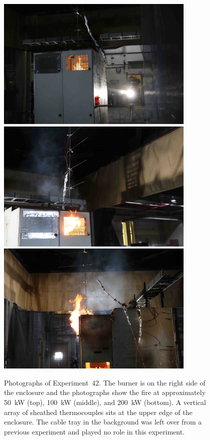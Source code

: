 \begin{figure}[p]
\centering
\includegraphics[height=2.50in]{../FIGURES/Test_42_start} \\ \vspace{0.1in}
\includegraphics[height=2.50in]{../FIGURES/Test_42_rear} \\ \vspace{0.1in}
\includegraphics[height=2.50in]{../FIGURES/Test_42_side}
\caption[Photographs of Experiment~42]{Photographs of Experiment~42. The burner is on the right side of the enclosure and the photographs show the fire at approximately 50~kW (top), 100~kW (middle), and 200~kW (bottom). A vertical array of sheathed thermocouples sits at the upper edge of the enclosure. The cable tray in the background was left over from a previous experiment and played no role in this experiment. }
\label{fig:Test_42_photos}
\end{figure}


